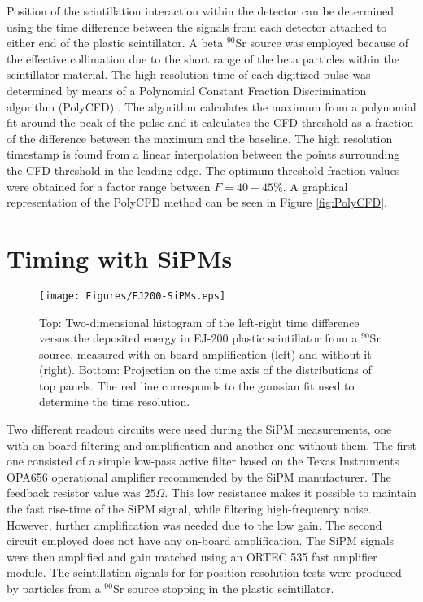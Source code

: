 Position of the scintillation interaction within the detector can be determined using the time difference between the signals from each detector attached to either end of the plastic scintillator. A beta $^{90}$Sr source was employed because of the effective collimation due to the short range of the beta particles within the scintillator material. The high resolution time of each digitized pulse was determined by means of a Polynomial Constant Fraction Discrimination  algorithm (PolyCFD) \cite{PhDCory}. The algorithm calculates the maximum from a polynomial fit around the peak of the pulse and it calculates the CFD threshold as a fraction of the difference between the maximum and the baseline. The high resolution timestamp is found from a linear interpolation between the points surrounding the CFD threshold in the leading edge. The optimum threshold fraction values were obtained for a factor range between $F=40-45\%$. A graphical representation of the PolyCFD method can be seen in Figure \ref{fig:PolyCFD}.

\section{Timing with SiPMs}
\begin{figure}[hbt]
\centering
\texttt{[image: Figures/EJ200-SiPMs.eps]}
\caption{Top: Two-dimensional histogram of the left-right time difference versus the deposited energy in EJ-200 plastic scintillator from a $^{90}$Sr source, measured with on-board amplification (left) and without it (right). Bottom: Projection on the time axis of the  distributions of top panels. The red line corresponds to the gaussian fit used to determine the time resolution.}
\label{fig:SiPMtiming}
\end{figure}

Two different readout circuits were used during the SiPM measurements, one with on-board  filtering and amplification and another one without them. The first one consisted of a simple low-pass active filter based on the Texas Instruments\textsuperscript{\textregistered} OPA656 operational amplifier recommended by the SiPM manufacturer. The feedback resistor value was $25\Omega$. This low resistance makes it possible to maintain the fast rise-time of the SiPM signal, while filtering high-frequency noise. However, further amplification was needed due to the low gain.  The second circuit employed does not have any on-board amplification. The SiPM signals were then amplified and gain matched using an ORTEC\textsuperscript{\textregistered} 535 fast amplifier module. The scintillation signals for for position resolution tests were produced by particles from a $^{90}$Sr source stopping in the plastic scintillator.

